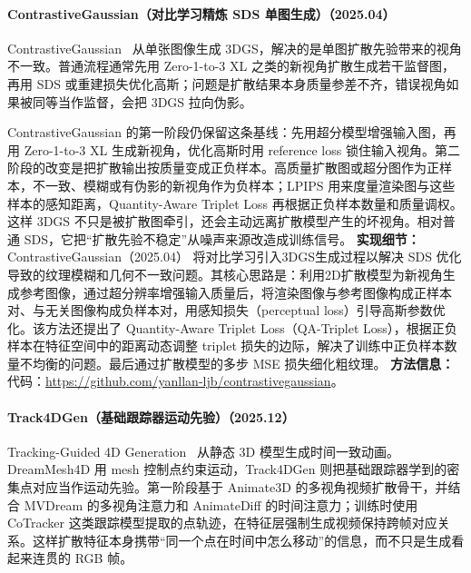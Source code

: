 \paragraph{ContrastiveGaussian（对比学习精炼 SDS 单图生成）（2025.04）}
ContrastiveGaussian~\cite{2504_08100} 从单张图像生成 3DGS，解决的是单图扩散先验带来的视角不一致。普通流程通常先用 Zero-1-to-3 XL 之类的新视角扩散生成若干监督图，再用 SDS 或重建损失优化高斯；问题是扩散结果本身质量参差不齐，错误视角如果被同等当作监督，会把 3DGS 拉向伪影。

ContrastiveGaussian 的第一阶段仍保留这条基线：先用超分模型增强输入图，再用 Zero-1-to-3 XL 生成新视角，优化高斯时用 reference loss 锁住输入视角。第二阶段的改变是把扩散输出按质量变成正负样本。高质量扩散图或超分图作为正样本，不一致、模糊或有伪影的新视角作为负样本；LPIPS 用来度量渲染图与这些样本的感知距离，Quantity-Aware Triplet Loss 再根据正负样本数量和质量调权。这样 3DGS 不只是被扩散图牵引，还会主动远离扩散模型产生的坏视角。相对普通 SDS，它把“扩散先验不稳定”从噪声来源改造成训练信号。
\textbf{实现细节：} ContrastiveGaussian（2025.04） 将对比学习引入3DGS生成过程以解决 SDS 优化导致的纹理模糊和几何不一致问题。其核心思路是：利用2D扩散模型为新视角生成参考图像，通过超分辨率增强输入质量后，将渲染图像与参考图像构成正样本对、与无关图像构成负样本对，用感知损失（perceptual loss）引导高斯参数优化。该方法还提出了 Quantity-Aware Triplet Loss（QA-Triplet Loss），根据正负样本在特征空间中的距离动态调整 triplet 损失的边际，解决了训练中正负样本数量不均衡的问题。最后通过扩散模型的多步 MSE 损失细化粗纹理。
\textbf{方法信息：} 代码：\url{https://github.com/yanllan-ljb/contrastivegaussian}。



\paragraph{Track4DGen（基础跟踪器运动先验）（2025.12）}
Tracking-Guided 4D Generation~\cite{2512_06158} 从静态 3D 模型生成时间一致动画。DreamMesh4D 用 mesh 控制点约束运动，Track4DGen 则把基础跟踪器学到的密集点对应当作运动先验。第一阶段基于 Animate3D 的多视角视频扩散骨干，并结合 MVDream 的多视角注意力和 AnimateDiff 的时间注意力；训练时使用 CoTracker 这类跟踪模型提取的点轨迹，在特征层强制生成视频保持跨帧对应关系。这样扩散特征本身携带“同一个点在时间中怎么移动”的信息，而不只是生成看起来连贯的 RGB 帧。

